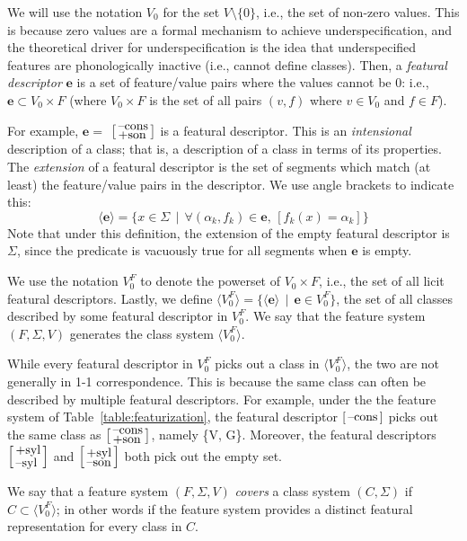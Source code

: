 \documentclass[12pt, oneside]{article}   	%
\newcommand{\featmat}[1]
{$\begin{bsmallmatrix*}[l]\text{\normalsize #1}\end{bsmallmatrix*}$}
\newcommand{\featmattwo}[2]{$\begin{bsmallmatrix*}[l]\text{\normalsize #1}\\\text{\normalsize #2}\end{bsmallmatrix*}$}
\begin{document}
\noindent We will use the notation $V_0$ for the set $V \setminus \{0\}$, i.e., the set of non-zero values. This is because zero values are a formal mechanism to achieve underspecification, and the theoretical driver for underspecification is the idea that underspecified features are phonologically inactive (i.e., cannot define classes). Then, a \textit{featural descriptor} $\mathbf{e}$ is a set of feature/value pairs where the values cannot be $0$: i.e., $\mathbf{e} \subset V_0 \times F$ (where $V_0 \times F$ is the set of all pairs $(v,f)$ where $v \in V_0$ and $f \in F$). 

For example, $\mathbf{e} =$  \featmattwo{--cons}{+son} is a featural descriptor. This is an \textit{intensional} description of a class; that is, a description of a class in terms of its properties. The \textit{extension} of a featural descriptor is the set of segments which match (at least) the feature/value pairs in the descriptor. We use angle brackets to indicate this:
$$ \big \langle \mathbf{e} \big \rangle = \{x \in \Sigma \, \mid \, \forall (\alpha_k, f_k) \in \mathbf{e} \text{,  } [ f_k(x) = \alpha_k ] \} $$
Note that under this definition, the extension of the empty featural descriptor is $\Sigma$, since the predicate is vacuously true for all segments when $\mathbf{e}$ is empty. 

We use the notation $V_0^F$ to denote the powerset of $V_0 \times F$, i.e., the set of all licit featural descriptors. Lastly, we define $\langle V_0^F \rangle = \{ \langle \mathbf{e} \rangle \, \mid \, \mathbf{e} \in V_0^F \}$, the set of all classes described by some featural descriptor in $V_0^F$. We say that the feature system $(F, \Sigma, V)$ generates the class system $\langle V_0^F \rangle$.

While every featural descriptor in $V_0^F$ picks out a class in $\langle V_0^F \rangle$, the two are not generally in 1-1 correspondence. This is because the same class can often be described by multiple featural descriptors. For example, under the the feature system of Table~\ref{table:featurization}, the featural descriptor \featmat{--cons} picks out the same class as \featmattwo{--cons}{+son}, namely \{V, G\}. Moreover, the featural descriptors \featmattwo{+syl}{--syl} and \featmattwo{+syl}{--son} both pick out the empty set.

We say that a feature system $(F, \Sigma, V)$ \textit{covers} a class system $(C, \Sigma)$ if $C \subset \langle V_0^F \rangle$; in other words if the feature system provides a distinct featural representation for every class in $C$. 
\end{document}
